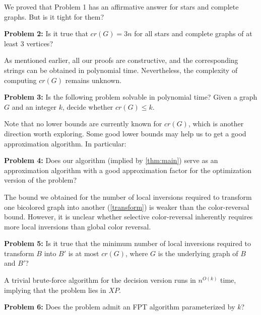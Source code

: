 \documentclass[runningheads,orivec]{llncs}
\begin{document}
We proved that Problem 1 has an affirmative answer for stars and complete graphs. But is it tight for them?

\noindent
\textbf{Problem 2:} Is it true that $cr(G) = 3n$ for all stars and complete graphs of at least 3 vertices?

As mentioned earlier, all our proofs are constructive, and the corresponding strings can be obtained in polynomial time. Nevertheless, the complexity of computing $cr(G)$ remains unknown.

\noindent
\textbf{Problem 3:} Is the following problem solvable in polynomial time?  
Given a graph $G$ and an integer $k$, decide whether $cr(G)\leq k$.

Note that no lower bounds are currently known for $cr(G)$, which is another direction worth exploring. Some good lower bounds may help us to get a good approximation algorithm. In particular:

\noindent
\textbf{Problem 4:} Does our algorithm (implied by \autoref{thm:main}) serve as an approximation algorithm with a good approximation factor for the optimization version of the problem?

The bound we obtained for the number of local inversions required to transform one bicolored graph into another (\autoref{transform}) is weaker than the color-reversal bound. However, it is unclear whether selective color-reversal inherently requires more local inversions than global color reversal.

\noindent
\textbf{Problem 5:} Is it true that the minimum number of local inversions required to transform $B$ into $B'$ is at most $cr(G)$, where $G$ is the underlying graph of $B$ and $B'$?

A trivial brute-force algorithm for the decision version runs in $n^{O(k)}$ time, implying that the problem lies in $XP$. 

\noindent
\textbf{Problem 6:} Does the problem admit an FPT algorithm parameterized by $k$?



\end{document}
